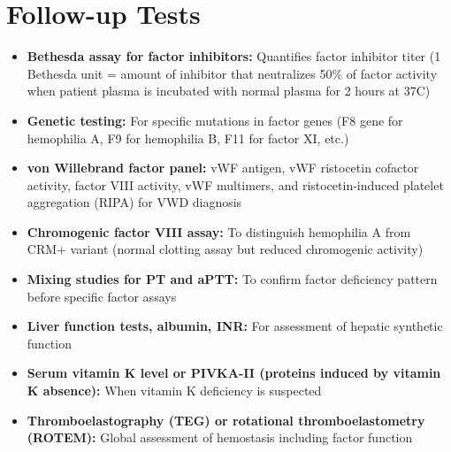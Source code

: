 \section*{Follow-up Tests}
\begin{itemize}
  \item \textbf{Bethesda assay for factor inhibitors:} Quantifies factor inhibitor titer (1 Bethesda unit = amount of inhibitor that neutralizes 50\% of factor activity when patient plasma is incubated with normal plasma for 2 hours at 37\textdegree{}C)
  \item \textbf{Genetic testing:} For specific mutations in factor genes (F8 gene for hemophilia A, F9 for hemophilia B, F11 for factor XI, etc.)
  \item \textbf{von Willebrand factor panel:} vWF antigen, vWF ristocetin cofactor activity, factor VIII activity, vWF multimers, and ristocetin-induced platelet aggregation (RIPA) for VWD diagnosis
  \item \textbf{Chromogenic factor VIII assay:} To distinguish hemophilia A from CRM+ variant (normal clotting assay but reduced chromogenic activity)
  \item \textbf{Mixing studies for PT and aPTT:} To confirm factor deficiency pattern before specific factor assays
  \item \textbf{Liver function tests, albumin, INR:} For assessment of hepatic synthetic function
  \item \textbf{Serum vitamin K level or PIVKA-II (proteins induced by vitamin K absence):} When vitamin K deficiency is suspected
  \item \textbf{Thromboelastography (TEG) or rotational thromboelastometry (ROTEM):} Global assessment of hemostasis including factor function
\end{itemize}

